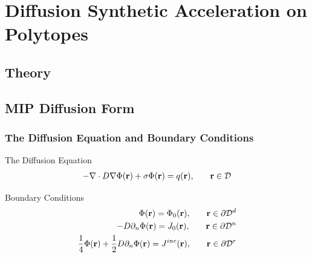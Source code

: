 \documentclass[]{beamer}
\begin{document}
\section[DSA on Polytopes]{Diffusion Synthetic Acceleration on Polytopes}
\subsection{Theory}
\begin{frame}[t]\frametitle{}

\end{frame}
\begin{frame}[t]\frametitle{}

\end{frame}
\subsection{MIP Diffusion Form}
\begin{frame}[t]\frametitle{The Diffusion Equation and Boundary Conditions}
	\begin{block}{The Diffusion Equation} {\small 
     		\begin{align*}
 	 		{ \small -{\bf \nabla} \cdot D {\bf \nabla} \Phi ({\bf r}) + \sigma \Phi ({\bf r}) = q ({\bf r}), \qquad  {\bf r} \in \mathcal{D} }
        	\end{align*} }
        	\end{block}
        	\begin{block}{Boundary Conditions} {\small 
		\begin{align*}
 	 		{ \small \Phi ({\bf r})  = \Phi_0 ({\bf r}) , \qquad {\bf r} \in \partial \mathcal{D}^d } \\
 	 		{ \small -D \partial_n \Phi ({\bf r})  = J_0 ({\bf r}) , \qquad {\bf r} \in \partial \mathcal{D}^n } \\
 	 		{ \small \frac{1}{4} \Phi ({\bf r})  + \frac{1}{2}D \partial_n \Phi ({\bf r})  = J^{inc} ({\bf r}) ,  \qquad {\bf r} \in \partial \mathcal{D}^r}
        		\end{align*} }
    \end{block}
\end{frame}
\end{document}
